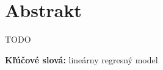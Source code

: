 \thispagestyle{empty}
\section*{Abstrakt}
TODO

\begin{flushleft}
  \textbf{Kľúčové slová:} lineárny regresný model
\end{flushleft}